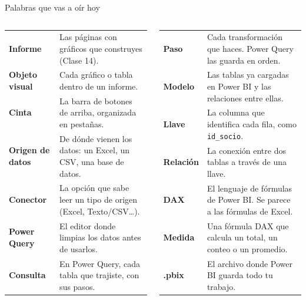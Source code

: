 \documentclass[aspectratio=169,11pt]{beamer}
\begin{document}
\begin{frame}[t]{Palabras que vas a oír hoy}
  \scriptsize
  \renewcommand{\arraystretch}{1.12}
  \begin{columns}[T,onlytextwidth]
    \begin{tabular}{@{}L{1.9cm}L{4.45cm}@{}}
      \toprule
      \textbf{Informe} & Las páginas con gráficos que construyes (Clase 14). \\
      \textbf{Objeto visual} & Cada gráfico o tabla dentro de un informe. \\
      \textbf{Cinta} & La barra de botones de arriba, organizada en pestañas. \\
      \textbf{Origen de datos} & De dónde vienen los datos: un Excel, un CSV, una base de datos. \\
      \textbf{Conector} & La opción que sabe leer un tipo de origen (Excel, Texto/CSV\ldots). \\
      \textbf{Power Query} & El editor donde limpias los datos antes de usarlos. \\
      \textbf{Consulta} & En Power Query, cada tabla que trajiste, con sus pasos. \\
      \bottomrule
    \end{tabular}
    \begin{tabular}{@{}L{1.9cm}L{4.45cm}@{}}
      \toprule
      \textbf{Paso} & Cada transformación que haces. Power Query las guarda en orden. \\
      \textbf{Modelo} & Las tablas ya cargadas en Power BI y las relaciones entre ellas. \\
      \textbf{Llave} & La columna que identifica cada fila, como \texttt{id\_socio}. \\
      \textbf{Relación} & La conexión entre dos tablas a través de una llave. \\
      \textbf{DAX} & El lenguaje de fórmulas de Power BI. Se parece a las fórmulas de Excel. \\
      \textbf{Medida} & Una fórmula DAX que calcula un total, un conteo o un promedio. \\
      \textbf{.pbix} & El archivo donde Power BI guarda todo tu trabajo. \\
      \bottomrule
    \end{tabular}
  \end{columns}
\end{frame}
\end{document}
